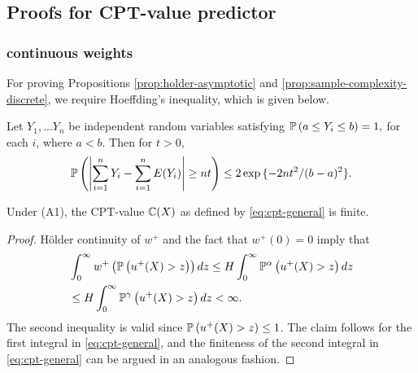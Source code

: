\subsection{Proofs for CPT-value predictor}
\label{appendix:cpt-est}

\subsubsection{\holder continuous weights}
\label{sec:holder-proofs}
For proving Propositions \ref{prop:holder-asymptotic} and \ref{prop:sample-complexity-discrete}, we require Hoeffding's inequality, which is given below.
\begin{lemma}
Let $Y_1,...Y_n$ be independent random variables satisfying $\mathbb{P}\left( a\leq Y_i \leq b \right)= 1,$ for each $i$, where $a<b.
$ Then for $t>0$,
$$\mathbb{P}\left( \left|\sum_{i=1}^n Y_i -\sum_{i=1}^n E(Y_i)\right| \geq nt  \right) \leq 2\exp{\{-2nt^2 /(b-a)^2\}}. $$
\end{lemma}

\begin{proposition}
\label{prop:Holder-cpt-finite}
Under (A1), the CPT-value $\mathbb{C}(X)$ as defined by \eqref{eq:cpt-general} is finite. 
\end{proposition}
\begin{proof}

H\"{o}lder continuity of $w^+$ and the fact that $w^+(0)=0$ imply that 
\begin{align*}
&\int_0^{\infty} w^+\left(\mathbb{P}\left( u^{+}(X)>z \right)\right) dz 
\le H \int_0^{\infty} \mathbb{P}^{\alpha} \left(u^+(X)>z\right) dz\\
&\le H \int_0^{\infty} \mathbb{P}^{\gamma} \left(u^+(X)>z\right) dz 
<\infty.
\end{align*}
The second inequality is valid since $\mathbb{P}\left( u^+(X)>z \right) \leq 1$. The claim follows for the first integral in \eqref{eq:cpt-general}, and the finiteness of the second integral in \eqref{eq:cpt-general} can be argued in an analogous fashion.
\end{proof}

